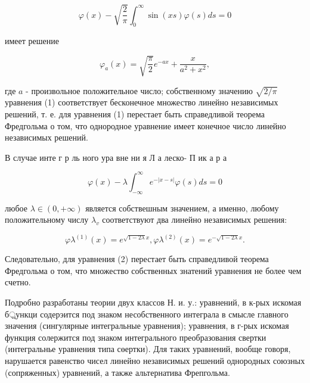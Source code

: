 \documentclass[10pt]{article}
\begin{document}
\[

\varphi(x)-\sqrt{\frac{2}{\pi}} \int_{0}^{\infty} \sin (x s) \varphi(s) d s=0

\]



имеет решение



\[

\varphi_{a}(x)=\sqrt{\frac{\pi}{2}} e^{-a x}+\frac{x}{a^{2}+x^{2}},

\]



где $a$ - произвольное положительное число; собственному значению $\sqrt{2 / \pi}$ уравнения (1) соответствует бесконечное множество линейно независимых решений, т. е. для уравнения (1) перестает быть справедливой теорема Фредгольма о том, что однородное уравнение имеет конечное число линейно независимых решений.



В случае инте г р ль ного ура вне ни я Л а леско- П ик а р а



\[

\varphi(x)-\lambda \int_{-\infty}^{\infty} e^{-|x-s|} \varphi(s) d s=0

\]



любое $\lambda \in(0,+\infty)$ является собствешным значением, а именно, любому положительному числу $\lambda_{v}$ соответствуют два линейно независимых решения:



\[

\varphi \lambda^{(1)}(x)=e^{\sqrt{1-2 \lambda} x}, \varphi \lambda^{(2)}(x)=e^{-\sqrt{1-2 \lambda} x} .

\]



Следовательно, для уравнения (2) перестает быть справедливой теорема Фредгольма о том, что множество собственных знатений уравнения не более чем счетно.



Подробно разработаны теории двух классов Н. и. у.: уравнений, в к-рых искомая б্রункци содерэится под знаком несобственного интеграла в смысле главного значения (сингулярные интегральные уравнения); уравнения, в г-рых искомая функция солержится под знаком интегрального преобразования свертки (интегральнье уравнения типа сөертки). Для таких уравнений, вообще говоря, нарушается равенство чисел линейно независимых решений однородных союзных (сопряженных) уравнений, а также альтернатива Фрепгольма.
\end{document}
